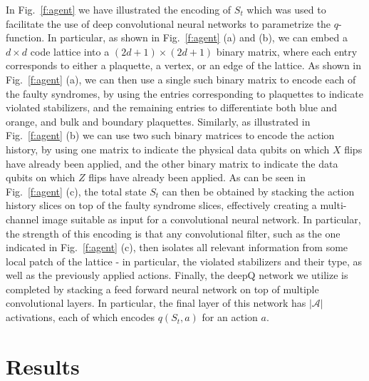 \documentclass[twocolumn,preprintnumbers,amsmath,amssymb,notitlepage,nofootinbib,longbibliography,superscriptaddress,aps,pra,10pt]{revtex4-1}
\begin{document}
	In Fig.~\ref{f:agent} we have illustrated the encoding of $S_t$ which was used to facilitate the use of deep convolutional neural networks to parametrize the $q$-function.
	In particular, as shown in Fig.~\ref{f:agent} (a) and (b), we can embed a $d\times d$ code lattice into a $(2d + 1)\times(2d+1)$ binary matrix, where each entry corresponds to either a plaquette, a vertex, or an edge of the lattice.
	As shown in Fig.~\ref{f:agent} (a), we can then use a single such binary matrix to encode each of the faulty syndromes, by using the entries corresponding to plaquettes to indicate violated stabilizers, and the remaining entries to differentiate both blue and orange, and bulk and boundary plaquettes.
	Similarly, as illustrated in  Fig.~\ref{f:agent} (b) we can use two such binary matrices to encode the action history, by using one matrix to indicate the physical data qubits on which $X$ flips have already been applied, and the other binary matrix to indicate the data qubits on which $Z$ flips have already been applied.
	As can be seen in Fig.~\ref{f:agent} (c), the total state $S_t$ can then be obtained by stacking the action history slices on top of the faulty syndrome slices, effectively creating a multi-channel image suitable as input for a convolutional neural network.
	In particular, the strength of this encoding is that any convolutional filter, such as the one indicated in Fig.~\ref{f:agent} (c), then isolates all relevant information from some local patch of the lattice - in particular, the violated stabilizers and their type, as well as the previously applied actions.
	Finally, the deepQ network we utilize is completed by stacking a feed forward neural network on top of multiple convolutional layers.
	In particular, the final layer of this network has $|\mathcal{A}|$ activations, each of which encodes $q(S_t,a)$ for an action $a$.

\section{Results}\label{s:results}
\end{document}
